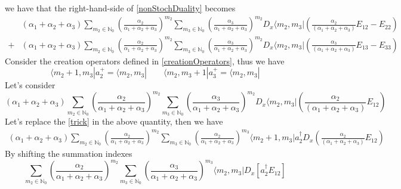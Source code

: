 \documentclass[11pt]{article}
\numberwithin{equation}{section}
\begin{document}
we have that the right-hand-side of \eqref{nonStochDuality} becomes
\begin{equation}\label{stepTrick}
\begin{split}
&(\alpha_{1}+\alpha_{2}+\alpha_{3})\sum_{m_{2}\in\mathbb{N}_{0}}	\left(\frac{\alpha_{2}}{\alpha_{1}+\alpha_{2}+\alpha_{3}}\right)^{m_{2}}\sum_{m_{3}\in \mathbb{N}_{0}}\left(\frac{\alpha_{3}}{\alpha_{1}+\alpha_{2}+\alpha_{3}}\right)^{m_{2}}D_{x}\langle m_{2},m_{3}|\left(\frac{\alpha_{2}}{(\alpha_{1}+\alpha_{2}+\alpha_{3})}E_{12}-E_{22}\right)
\\+&
(\alpha_{1}+\alpha_{2}+\alpha_{3})\sum_{m_{2}\in\mathbb{N}_{0}}	\left(\frac{\alpha_{2}}{\alpha_{1}+\alpha_{2}+\alpha_{3}}\right)^{m_{2}}\sum_{m_{3}\in \mathbb{N}_{0}}\left(\frac{\alpha_{3}}{\alpha_{1}+\alpha_{2}+\alpha_{3}}\right)^{m_{2}}D_{x}\langle m_{2},m_{3}|\left(\frac{\alpha_{3}}{(\alpha_{1}+\alpha_{2}+\alpha_{3})}E_{13}-E_{33}\right)
\end{split}
\end{equation}
Consider the creation operators defined in \eqref{creationOperators}, thus we have
\begin{equation}\label{trick}
	\langle m_{2}+1,m_{3}|a_{2}^{+}=\langle m_{2},m_{3}|\qquad	\langle m_{2}, m_{3}+1|a_{3}^{+}=\langle m_{2},m_{3}|
\end{equation}
Let's consider 
\begin{equation}
    (\alpha_{1}+\alpha_{2}+\alpha_{3})\sum_{m_{2}\in\mathbb{N}_{0}}	\left(\frac{\alpha_{2}}{\alpha_{1}+\alpha_{2}+\alpha_{3}}\right)^{m_{2}}\sum_{m_{3}\in \mathbb{N}_{0}}\left(\frac{\alpha_{3}}{\alpha_{1}+\alpha_{2}+\alpha_{3}}\right)^{m_{2}}D_{x}\langle m_{2},m_{3}|\left(\frac{\alpha_{2}}{(\alpha_{1}+\alpha_{2}+\alpha_{3})}E_{12}\right)
\end{equation}
Let's replace the \eqref{trick} in the above quantity, then we have
\begin{equation}
\begin{split}
(\alpha_{1}+\alpha_{2}+\alpha_{3})\sum_{m_{2}\in\mathbb{N}_{0}}	\left(\frac{\alpha_{2}}{\alpha_{1}+\alpha_{2}+\alpha_{3}}\right)^{m_{2}}\sum_{m_{3}\in \mathbb{N}_{0}}\left(\frac{\alpha_{2}}{\alpha_{1}+\alpha_{2}+\alpha_{3}}\right)^{m_{3}}\langle m_{2}+1,m_{3}|a_{2}^{\dagger}D_{x}\left(\frac{\alpha_{2}}{(\alpha_{1}+\alpha_{2}+\alpha_{3})}E_{12}\right)
\end{split}
\end{equation}
By shifting the summation indexes 
\begin{equation}\label{trick1}
\sum_{m_{2}\in\mathbb{N}_{0}}	\left(\frac{\alpha_{2}}{\alpha_{1}+\alpha_{2}+\alpha_{3}}\right)^{m_{2}}\sum_{m_{3}\in \mathbb{N}_{0}}\left(\frac{\alpha_{3}}{\alpha_{1}+\alpha_{2}+\alpha_{3}}\right)^{m_{3}}\langle m_{2},m_{3}|D_{x}\left[a_{2}^{\dagger}E_{12}\right]
\end{equation}
\end{document}

